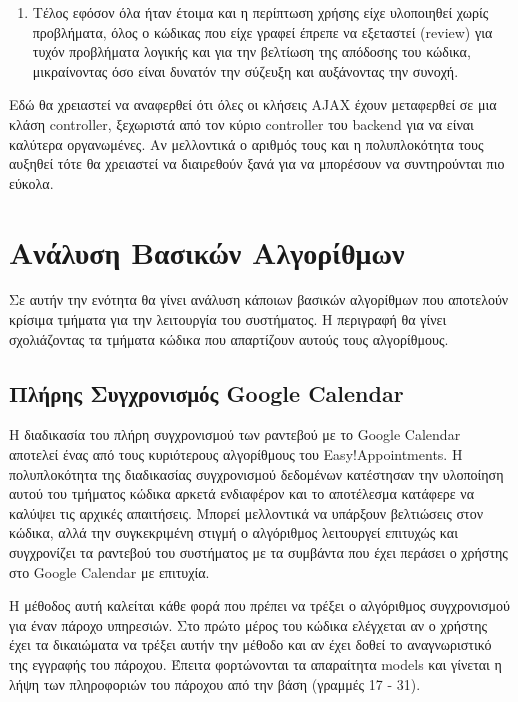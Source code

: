 \begin{enumerate}
\item Τέλος εφόσον όλα ήταν έτοιμα και η περίπτωση χρήσης είχε υλοποιηθεί χωρίς προβλήματα, όλος ο κώδικας που είχε γραφεί έπρεπε να εξεταστεί (review) για τυχόν προβλήματα λογικής και για την βελτίωση της απόδοσης του κώδικα, μικραίνοντας όσο είναι δυνατόν την σύζευξη και αυξάνοντας την συνοχή.
\end{enumerate}

Εδώ θα χρειαστεί να αναφερθεί ότι όλες οι κλήσεις AJAX έχουν μεταφερθεί σε μια κλάση controller, ξεχωριστά από τον κύριο controller του backend για να είναι καλύτερα οργανωμένες. Αν μελλοντικά ο αριθμός τους και η πολυπλοκότητα τους αυξηθεί τότε θα χρειαστεί να διαιρεθούν ξανά για να μπορέσουν να συντηρούνται πιο εύκολα.

\section{Ανάλυση Βασικών Αλγορίθμων}
Σε αυτήν την ενότητα θα γίνει ανάλυση κάποιων βασικών αλγορίθμων που αποτελούν κρίσιμα τμήματα για την λειτουργία του συστήματος. Η περιγραφή θα γίνει σχολιάζοντας τα τμήματα κώδικα που απαρτίζουν αυτούς τους αλγορίθμους.

\subsection{Πλήρης Συγχρονισμός Google Calendar}
Η διαδικασία του πλήρη συγχρονισμού των ραντεβού με το Google Calendar αποτελεί ένας από τους κυριότερους αλγορίθμους του Easy!Appointments. Η πολυπλοκότητα της διαδικασίας συγχρονισμού δεδομένων κατέστησαν την υλοποίηση αυτού του τμήματος κώδικα αρκετά ενδιαφέρον και το αποτέλεσμα κατάφερε να καλύψει τις αρχικές απαιτήσεις. Μπορεί μελλοντικά να υπάρξουν βελτιώσεις στον κώδικα, αλλά την συγκεκριμένη στιγμή ο αλγόριθμος λειτουργεί επιτυχώς και συγχρονίζει τα ραντεβού του συστήματος με τα συμβάντα που έχει περάσει ο χρήστης στο Google Calendar με επιτυχία.



Η μέθοδος αυτή καλείται κάθε φορά που πρέπει να τρέξει ο αλγόριθμος συγχρονισμού για έναν πάροχο υπηρεσιών. Στο πρώτο μέρος του κώδικα ελέγχεται αν ο χρήστης έχει τα δικαιώματα να τρέξει αυτήν την μέθοδο και αν έχει δοθεί το αναγνωριστικό της εγγραφής του πάροχου. Έπειτα φορτώνονται τα απαραίτητα models και γίνεται η λήψη των πληροφοριών του πάροχου από την βάση (γραμμές 17 - 31). 

